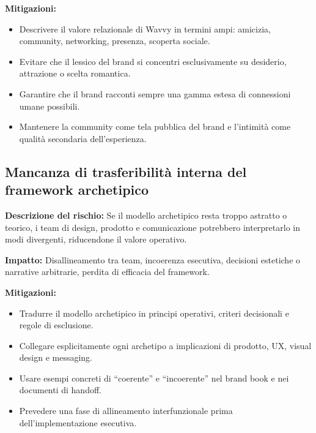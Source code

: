 \documentclass[a4paper, 11pt, table, dvipsnames]{article}
\begin{document}
\textbf{Mitigazioni:}
\begin{itemize}
      \item Descrivere il valore relazionale di Wavvy in termini
            ampi: amicizia, community, networking, presenza,
            scoperta sociale.

      \item Evitare che il lessico del brand si concentri esclusivamente
            su desiderio, attrazione o scelta romantica.

      \item Garantire che il brand racconti sempre una gamma estesa
            di connessioni umane possibili.

      \item Mantenere la community come tela pubblica del brand
            e l'intimità come qualità secondaria dell'esperienza.
\end{itemize}

\subsection{Mancanza di trasferibilità interna del
      framework archetipico}

\textbf{Descrizione del rischio:} Se il modello archetipico
resta troppo astratto o teorico, i team di design, prodotto
e comunicazione potrebbero interpretarlo in modi divergenti,
riducendone il valore operativo.

\textbf{Impatto:} Disallineamento tra team, incoerenza
esecutiva, decisioni estetiche o narrative arbitrarie,
perdita di efficacia del framework.

\textbf{Mitigazioni:}
\begin{itemize}
      \item Tradurre il modello archetipico in principi operativi,
            criteri decisionali e regole di esclusione.

      \item Collegare esplicitamente ogni archetipo a implicazioni
            di prodotto, UX, visual design e messaging.

      \item Usare esempi concreti di \enquote{coerente} e
            \enquote{incoerente} nel brand book e nei documenti di
            handoff.

      \item Prevedere una fase di allineamento interfunzionale
            prima dell'implementazione esecutiva.
\end{itemize}
\end{document}
